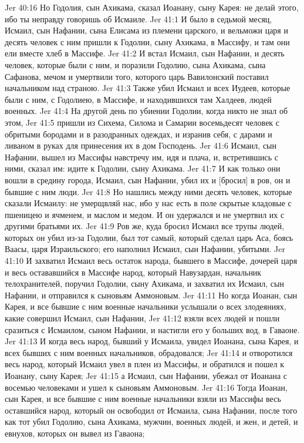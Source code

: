 Jer 40:16  Но Годолия, сын Ахикама, сказал Иоанану, сыну Карея: не делай этого, ибо ты неправду говоришь об Исмаиле.
Jer 41:1  И было в седьмой месяц, Исмаил, сын Нафании, сына Елисама из племени царского, и вельможи царя и десять человек с ним пришли к Годолии, сыну Ахикама, в Массифу, и там они ели вместе хлеб в Массифе.
Jer 41:2  И встал Исмаил, сын Нафании, и десять человек, которые были с ним, и поразили Годолию, сына Ахикама, сына Сафанова, мечом и умертвили того, которого царь Вавилонский поставил начальником над страною.
Jer 41:3  Также убил Исмаил и всех Иудеев, которые были с ним, с Годолиею, в Массифе, и находившихся там Халдеев, людей военных.
Jer 41:4  На другой день по убиении Годолии, когда никто не знал об этом,
Jer 41:5  пришли из Сихема, Силома и Самарии восемьдесят человек с обритыми бородами и в разодранных одеждах, и изранив себя, с дарами и ливаном в руках для принесения их в дом Господень.
Jer 41:6  Исмаил, сын Нафании, вышел из Массифы навстречу им, идя и плача, и, встретившись с ними, сказал им: идите к Годолии, сыну Ахикама.
Jer 41:7  И как только они вошли в средину города, Исмаил, сын Нафании, убил их и [бросил] в ров, он и бывшие с ним люди.
Jer 41:8  Но нашлись между ними десять человек, которые сказали Исмаилу: не умерщвляй нас, ибо у нас есть в поле скрытые кладовые с пшеницею и ячменем, и маслом и медом. И он удержался и не умертвил их с другими братьями их.
Jer 41:9  Ров же, куда бросил Исмаил все трупы людей, которых он убил из-за Годолии, был тот самый, который сделал царь Аса, боясь Ваасы, царя Израильского; его наполнил Исмаил, сын Нафании, убитыми.
Jer 41:10  И захватил Исмаил весь остаток народа, бывшего в Массифе, дочерей царя и весь остававшийся в Массифе народ, который Навузардан, начальник телохранителей, поручил Годолии, сыну Ахикама, и захватил их Исмаил, сын Нафании, и отправился к сыновьям Аммоновым.
Jer 41:11  Но когда Иоанан, сын Карея, и все бывшие с ним военные начальники услышали о всех злодеяниях, какие совершил Исмаил, сын Нафании,
Jer 41:12  взяли всех людей и пошли сразиться с Исмаилом, сыном Нафании, и настигли его у больших вод, в Гаваоне.
Jer 41:13  И когда весь народ, бывший у Исмаила, увидел Иоанана, сына Карея, и всех бывших с ним военных начальников, обрадовался;
Jer 41:14  и отворотился весь народ, который Исмаил увел в плен из Массифы, и обратился и пошел к Иоанану, сыну Карея;
Jer 41:15  а Исмаил, сын Нафании, убежал от Иоанана с восемью человеками и ушел к сыновьям Аммоновым.
Jer 41:16  Тогда Иоанан, сын Карея, и все бывшие с ним военные начальники взяли из Массифы весь оставшийся народ, который он освободил от Исмаила, сына Нафании, после того как тот убил Годолию, сына Ахикама, мужчин, военных людей, и жен, и детей, и евнухов, которых он вывел из Гаваона;

